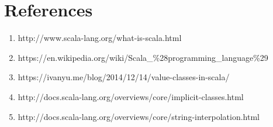 \documentclass[12pt]{article}
\begin{document}
\section{References}
	\begin{enumerate}
		\item
			http://www.scala-lang.org/what-is-scala.html
		\item
			https://en.wikipedia.org/wiki/Scala\_\%28programming\_language\%29
		\item
			https://ivanyu.me/blog/2014/12/14/value-classes-in-scala/
		\item 
			http://docs.scala-lang.org/overviews/core/implicit-classes.html
		\item
			http://docs.scala-lang.org/overviews/core/string-interpolation.html
	\end{enumerate}
\end{document}
